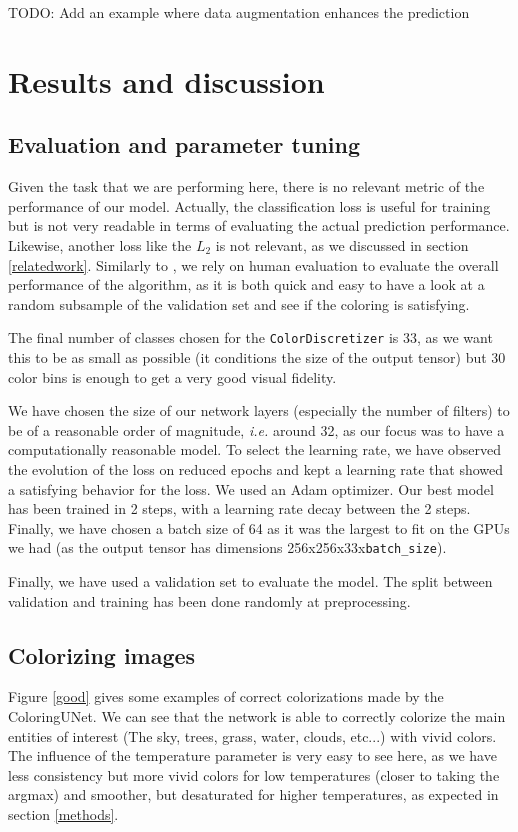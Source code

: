 \documentclass[10pt,twocolumn,letterpaper]{article}
\begin{document}
TODO: Add an example where data augmentation enhances the prediction

\section{Results and discussion}
\subsection{Evaluation and parameter tuning}

Given the task that we are performing here, there is no relevant metric of the performance of our model. Actually, the classification loss is useful for training but is not very readable in terms of evaluating the actual prediction performance. Likewise, another loss like the $L_2$ is not relevant, as we discussed in section \ref{relatedwork}. Similarly to \cite{zhang2016colorful}, we rely on human evaluation to evaluate the overall performance of the algorithm, as it is both quick and easy to have a look at a random subsample of the validation set and see if the coloring is satisfying.

The final number of classes chosen for the \texttt{ColorDiscretizer} is 33, as we want this to be as small as possible (it conditions the size of the output tensor) but 30 color bins is enough to get a very good visual fidelity.

We have chosen the size of our network layers (especially the number of filters) to be of a reasonable order of magnitude, \textit{i.e.} around 32, as our focus was to have a computationally reasonable model. To select the learning rate, we have observed the evolution of the loss on reduced epochs and kept a learning rate that showed a satisfying behavior for the loss. We used an Adam optimizer. Our best model has been trained in 2 steps, with a learning rate decay between the 2 steps. Finally, we have chosen a batch size of 64 as it was the largest to fit on the GPUs we had (as the output tensor has dimensions 256x256x33x\texttt{batch\_size}).
 
Finally, we have used a validation set to evaluate the model. The split between validation and training  has been done randomly at preprocessing. 
\subsection{Colorizing images}

Figure \ref{good} gives some examples of correct colorizations made by the ColoringUNet. We can see that the network is able to correctly colorize the main entities of interest (The sky, trees, grass, water, clouds, etc...) with vivid colors. The influence of the temperature parameter is very easy to see here, as we have less consistency but more vivid colors for low temperatures (closer to taking the argmax) and smoother, but desaturated for higher temperatures, as expected in section \ref{methods}.
\end{document}
